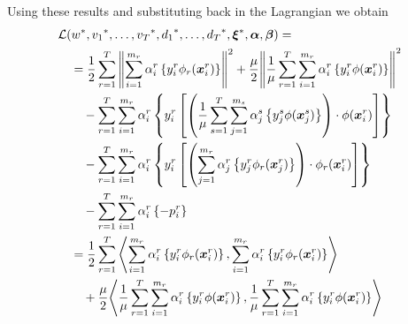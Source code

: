 
Using these results and substituting back in the Lagrangian we obtain
\begin{equation}\nonumber
    \begin{aligned}
        &  \lagr(\optim{{w}}, \optim{{v}_1}, \ldots, \optim{{v}_\ntasks}, \optim{d_1}, \ldots, \optim{d_\ntasks}, \optim{\fv{\xi}}, \fv{\alpha}, \fv{\beta}) =\\
        &\quad =  \frac{1}{2} \sum_{r= 1}^T{\norm{\sum_{i=1}^{m_r} {\alpha_i^r} \left\lbrace y_i^r \phi_r(\fv{x}_i^r) \right\rbrace}^2} + \frac{\mu}{2} {\norm{ \frac{1}{\mu}\sum_{r= 1}^T \sum_{i=1}^{m_r} {\alpha_i^r} \left\lbrace y_i^r \phi(\fv{x}_i^r) \right\rbrace}}^2 \\
        &\qquad -  \sum_{r= 1}^T \sum_{i=1}^{m_r} \alpha_i^r \left\lbrace y_{i}^r \left[ \left(\frac{1}{\mu} \sum_{s= 1}^T \sum_{j=1}^{m_s} {\alpha_j^s} \left\lbrace y_j^s \phi(\fv{x}_j^s) \right\rbrace \right) \cdot \phi(\fv{x}_{i}^r) \right]  \right\rbrace \\
        &\qquad -  \sum_{r= 1}^T \sum_{i=1}^{m_r} \alpha_i^r \left\lbrace y_{i}^r \left[  \left( \sum_{j=1}^{m_r} {\alpha_j^r} \left\lbrace y_j^r \phi_r(\fv{x}_j^r) \right\rbrace \right) \cdot \phi_r(\fv{x}_{i}^r)  \right]  \right\rbrace \\
        &\qquad -  \sum_{r= 1}^T \sum_{i=1}^{m_r} \alpha_i^r \left\lbrace - p_{i}^r  \right\rbrace \\
        &\quad =  \frac{1}{2} \sum_{r= 1}^T{\dotp{\sum_{i=1}^{m_r} {\alpha_i^r} \left\lbrace y_i^r \phi_r(\fv{x}_i^r) \right\rbrace}{\sum_{i=1}^{m_r} {\alpha_i^r} \left\lbrace y_i^r \phi_r(\fv{x}_i^r) \right\rbrace}} \\
        &\qquad + \frac{\mu}{2} {\dotp{ \frac{1}{\mu}\sum_{r= 1}^T \sum_{i=1}^{m_r} {\alpha_i^r} \left\lbrace y_i^r \phi(\fv{x}_i^r) \right\rbrace}{ \frac{1}{\mu}\sum_{r= 1}^T \sum_{i=1}^{m_r} {\alpha_i^r} \left\lbrace y_i^r \phi(\fv{x}_i^r) \right\rbrace}} \\

\end{aligned}
\end{equation}
